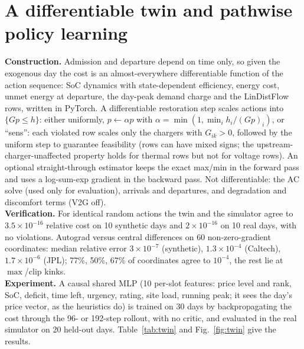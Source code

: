 \documentclass[10pt]{article}
\begin{document}
\section{A differentiable twin and pathwise policy learning}\label{sec:twin}
\textbf{Construction.} Admission and departure depend on time only, so given the exogenous day the cost is an almost-everywhere differentiable function of the action sequence: SoC dynamics with state-dependent efficiency, energy cost, unmet energy at departure, the day-peak demand charge and the LinDistFlow rows, written in PyTorch. A differentiable restoration step scales actions into $\{Gp\le h\}$: either uniformly, $p\leftarrow\alpha p$ with $\alpha=\min(1,\min_i h_i/(Gp)_i)$, or ``sens'': each violated row scales only the chargers with $G_{ik}>0$, followed by the uniform step to guarantee feasibility (rows can have mixed signs; the upstream-charger-unaffected property holds for thermal rows but not for voltage rows). An optional straight-through estimator keeps the exact max/min in the forward pass and uses a log-sum-exp gradient in the backward pass. Not differentiable: the AC solve (used only for evaluation), arrivals and departures, and degradation and discomfort terms (V2G off).\\
\textbf{Verification.} For identical random actions the twin and the simulator agree to $3.5\times10^{-16}$ relative cost on 10 synthetic days and $2\times10^{-16}$ on 10 real days, with no violations. Autograd versus central differences on 60 non-zero-gradient coordinates: median relative error $3\times10^{-7}$ (synthetic), $1.3\times10^{-4}$ (Caltech), $1.7\times10^{-6}$ (JPL); 77\%, 50\%, 67\% of coordinates agree to $10^{-4}$, the rest lie at $\max$/clip kinks.\\
\textbf{Experiment.} A causal shared MLP (10 per-slot features: price level and rank, SoC, deficit, time left, urgency, rating, site load, running peak; it sees the day's price vector, as the heuristics do) is trained on 30 days by backpropagating the cost through the 96- or 192-step rollout, with no critic, and evaluated in the real simulator on 20 held-out days. Table~\ref{tab:twin} and Fig.~\ref{fig:twin} give the results.
\end{document}
